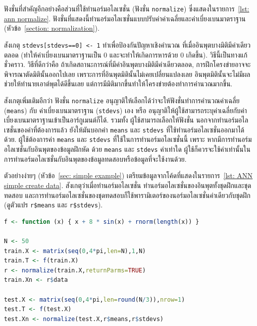 ฟังชั่นที่สำคัญอีกอย่างคือส่วนที่ใช้ทำนอร์มอไลเซชั่น (ฟังชั่น \texttt{normalize}) ซึ่งแสดงในรายการ~\ref{lst: ann normalize}.
ฟังชั่นที่แสดงนี้ทำนอร์มอไลเซชั่นแบบปรับค่าค่าเฉลี่ยและค่าเบี่ยงเบนมาตราฐาน (หัวข้อ~\ref{section: normalization}).

สังเกตุ \texttt{stdevs[stdevs==0] <- 1} ทำเพื่อป้องกันปัญหาเชิงคำนวณ ที่เมื่ออินพุตบางมิติมีค่าเดียวตลอด (ทำให้ค่าเบี่ยงเบนมาตราฐานเป็น $0$ และจะทำให้เกิดการหารด้วย $0$ เกิดขึ้น).
วิธีนี้เป็นทางแก้ชั่วคราว.
วิธีที่ดีกว่าคือ ถ้าเกิดสถานะการณ์ที่มีค่าอินพุตบางมิติมีค่าเดียวตลอด, 
การฝึกโครงข่ายอาจจะพิจารณาตัดมิตินั้นออกไปเลย 
เพราะการที่อินพุตมิตินั้นไม่เคยเปลี่ยนแปลงเลย 
อินพุตมิตินั้นจะไม่มีผลช่วยให้ทำนายเอาต์พุตได้ดีขึ้นเลย 
แต่การมีมิติมากขึ้นทำให้โครงข่ายต้องทำการคำนวณมากขึ้น.

สังเกตุเพิ่มเติมอีกว่า ฟังชั่น \texttt{normalize} อนุญาติให้เลือกได้ว่าจะให้ฟังชั่นทำการคำนวณค่าเฉลี่ย (\texttt{means}) กับ ค่าเบี่ยงเบนมาตราฐาน (\texttt{stdevs}) เอง 
หรือ อนุญาติให้ผู้ใช้สามารถระบุค่าเฉลี่ยกับค่าเบี่ยงเบนมาตราฐานเข้าเป็นอาร์กูเมนต์ก็ได้.
รวมทั้ง ผู้ใช้สามารถเลือกให้ฟังชั่น นอกจากทำนอร์มอไลเซชั่นของค่าที่ต้องการแล้ว ยังให้มันบอกค่า \texttt{means} และ \texttt{stdevs} ที่ใช้ทำนอร์มอไลเซชั่นออกมาได้ด้วย.
ผู้ใช้ต้องการค่า \texttt{means} และ \texttt{stdevs} ที่ใช้ในการทำนอร์มอไลเซชั่นนี้
เพราะ หากมีการทำนอร์มอไลเซชั่นกับอินพุตของข้อมูลฝึกหัด ด้วย \texttt{means} และ \texttt{stdevs} ค่าเท่าใด 
ผู้ใช้ก็ควรจะใช้ค่าเท่านั้นในการทำนอร์มอไลเซชั่นกับอินพุตของข้อมูลทดสอบหรือข้อมูลที่จะใช้งานด้วย.



ตัวอย่างง่ายๆ (หัวข้อ~\ref{sec: simple example}) เตรียมข้อมูลจากโค้ดที่แสดงในรายการ~\ref{lst: ANN simple create data}.
สังเกตุว่าเมื่อทำนอร์มอไลเซชั่น ทำนอร์มอไลเซชั่นของอินพุตทั้งชุดฝึกและชุดทดสอบ 
และการทำนอร์มอไลเซชั่นของชุดทดสอบก็ใช้พารามิเตอร์ของนอร์มอไลเซชั่นค่าเดียวกับชุดฝึก (ดูตัวแปร \texttt{r\$means} และ \texttt{r\$stdevs}).

\begin{lstlisting}[language=R,caption={เตรียมข้อมูลสำหรับตัวอย่างง่ายๆ},
label={lst: ANN simple create data}]
f <- function (x) { x + 8 * sin(x) + rnorm(length(x)) }

N <- 50
train.X <- matrix(seq(0,4*pi,len=N),1,N)
train.T <- f(train.X)
r <- normalize(train.X,returnParms=TRUE)
train.Xn <- r$data
  
test.X <- matrix(seq(0,4*pi,len=round(N/3)),nrow=1)
test.T <- f(test.X)
test.Xn <- normalize(test.X,r$means,r$stdevs)
\end{lstlisting}

